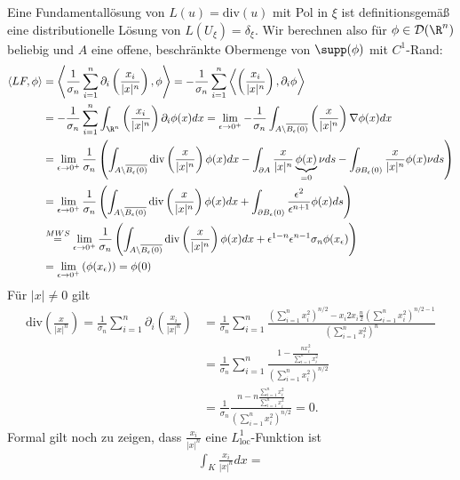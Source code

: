 \begin{solution}
Eine Fundamentallösung von $L(u) = \mathrm{div}(u)$ mit Pol in $\xi$ ist definitionsgemäß
eine distributionelle Lösung von $L(U_{\xi}) = \delta_{\xi}$. Wir berechnen also
für $\phi \in \mathcal{D}(\R^n)$ beliebig und $A$ eine offene, beschränkte Obermenge
von $\supp(\phi)$ mit $C^1$-Rand:
\begin{align*}
  \langle L F, \phi \rangle
  &= \left\langle \frac{1}{\sigma_n}\sum_{i = 1}^n\partial_i\left(\frac{x_i}{|x|^n}\right), \phi \right\rangle
  = -\frac{1}{\sigma_n}\sum_{i = 1}^n\left\langle \left(\frac{x_i}{|x|^n}\right), \partial_i\phi \right\rangle \\
  &= -\frac{1}{\sigma_n}\sum_{i = 1}^n\int_{\R^n}\left(\frac{x_i}{|x|^n}\right)\partial_i\phi(x)dx
  = \lim_{\epsilon \to 0^+}-\frac{1}{\sigma_n}\int_{A\backslash\overline{B_{\epsilon}(0)}}
  \left(\frac{x}{|x|^n}\right)\nabla \phi(x)dx \\
  &= \lim_{\epsilon \to 0^+}\frac{1}{\sigma_n}\left(\int_{A\backslash\overline{B_{\epsilon}(0)}}\mathrm{div}\left(\frac{x}{|x|^n}\right) \phi(x)dx
  - \int_{\partial A}\frac{x}{|x|^n}\underbrace{\phi(x)}_{=0}\nu ds
  - \int_{\partial B_{\epsilon}(0)}\frac{x}{|x|^n}\phi(x)\nu ds\right) \\
  &= \lim_{\epsilon \to 0^+}\frac{1}{\sigma_n}\left(\int_{A\backslash\overline{B_{\epsilon}(0)}}\mathrm{div}\left(\frac{x}{|x|^n}\right) \phi(x)dx
  + \int_{\partial B_{\epsilon}(0)}\frac{\epsilon^2}{\epsilon^{n+1}}\phi(x) ds\right) \\
  &\stackrel{MWS}{=} \lim_{\epsilon \to 0^+}\frac{1}{\sigma_n}\left(\int_{A\backslash\overline{B_{\epsilon}(0)}}\mathrm{div}\left(\frac{x}{|x|^n}\right) \phi(x)dx
  + \epsilon^{1-n}\epsilon^{n-1}\sigma_n\phi(x_{\epsilon})\right) \\
  &= \lim_{\epsilon \to 0^+}\left(\phi(x_{\epsilon})\right) = \phi(0)\\
\end{align*}
Für $|x| \neq 0$ gilt
\begin{align*}
  \mathrm{div}\left(\frac{x}{|x|^n}\right)
  =\frac{1}{\sigma_n}\sum_{i=1}^n\partial_i\left(\frac{x_i}{|x|^n}\right)
  &= \frac{1}{\sigma_n}\sum_{i=1}^n\frac{\left(\sum_{i=1}^nx_i^2\right)^{n/2} - x_i2x_i\frac{n}{2}\left(\sum_{i=1}^nx_i^2\right)^{n/2 - 1}}{\left(\sum_{i=1}^nx_i^2\right)^n} \\
  &= \frac{1}{\sigma_n}\sum_{i=1}^n\frac{1 - \frac{nx_i^2}{\sum_{i=1}^nx_i^2}}{\left(\sum_{i=1}^nx_i^2\right)^{n/2}} \\
  &= \frac{1}{\sigma_n}\frac{n - n\frac{\sum_{i=1}^nx_i^2}{\sum_{i=1}^nx_i^2}}{\left(\sum_{i=1}^nx_i^2\right)^{n/2}} = 0.
\end{align*}
Formal gilt noch zu zeigen, dass $\frac{x_i}{|x|^n}$ eine $L^1_{\mathrm{loc}}$-Funktion ist
\begin{align*}
  \int_{K}\frac{x_i}{|x|^n} dx = 
\end{align*}
\end{solution}

